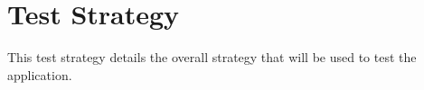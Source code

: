\section{Test Strategy}
This test strategy details the overall strategy that will be used to test the application.
